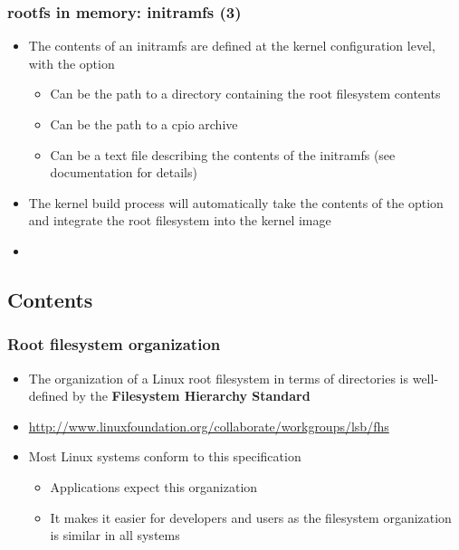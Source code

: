\begin{frame}
  \frametitle{rootfs in memory: initramfs (3)}
  \begin{itemize}
  \item The contents of an initramfs are defined at the kernel
    configuration level, with the 
    option
    \begin{itemize}
    \item Can be the path to a directory containing the root
      filesystem contents
    \item Can be the path to a cpio archive
    \item Can be a text file describing the contents of the initramfs
      (see documentation for details)
    \end{itemize}
  \item The kernel build process will automatically take the contents
    of the  option and integrate the
    root filesystem into the kernel image
  \item {}\\
  \end{itemize}
\end{frame}

\subsection{Contents}

\begin{frame}
  \frametitle{Root filesystem organization}
  \begin{itemize}
  \item The organization of a Linux root filesystem in terms of
    directories is well-defined by the {\bf Filesystem Hierarchy
      Standard}
  \item \url{http://www.linuxfoundation.org/collaborate/workgroups/lsb/fhs}
  \item Most Linux systems conform to this specification
    \begin{itemize}
    \item Applications expect this organization
    \item It makes it easier for developers and users as the
      filesystem organization is similar in all systems
    \end{itemize}
  \end{itemize}
\end{frame}

